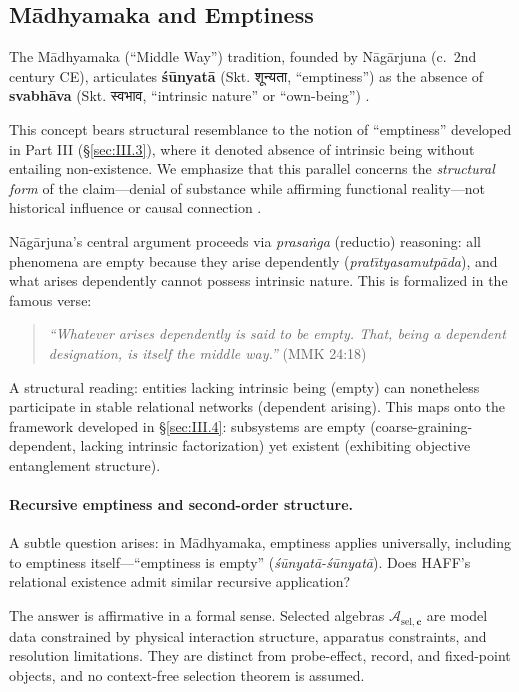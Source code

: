 \documentclass[11pt,a4paper]{article}
\begin{document}
\subsection{M\=adhyamaka and Emptiness}
\label{sec:IV.3}

The M\=adhyamaka (``Middle Way'') tradition, founded by N\=ag\=arjuna (c.\ 2nd century CE), articulates \textbf{śūnyat\=a} (Skt. शून्यता, ``emptiness'') as the absence of \textbf{svabh\=ava} (Skt. स्वभाव, ``intrinsic nature'' or ``own-being'') \cite{Nagarjuna_MMK_Garfield1995}. 

This concept bears structural resemblance to the notion of ``emptiness'' developed in Part III (§\ref{sec:III.3}), where it denoted absence of intrinsic being without entailing non-existence. We emphasize that this parallel concerns the \emph{structural form} of the claim—denial of substance while affirming functional reality—not historical influence or causal connection \cite{Garfield2002,Siderits2007}.

N\=ag\=arjuna's central argument proceeds via \emph{prasaṅga} (reductio) reasoning: all phenomena are empty because they arise dependently (\emph{prat\={\i}tyasamutp\=ada}), and what arises dependently cannot possess intrinsic nature. This is formalized in the famous verse:
\begin{quote}
\emph{``Whatever arises dependently is said to be empty. That, being a dependent designation, is itself the middle way.''} (MMK 24:18) \cite{Nagarjuna_MMK_Garfield1995}
\end{quote}

A structural reading: entities lacking intrinsic being (empty) can nonetheless participate in stable relational networks (dependent arising). This maps onto the framework developed in §\ref{sec:III.4}: subsystems are empty (coarse-graining-dependent, lacking intrinsic factorization) yet existent (exhibiting objective entanglement structure).

\paragraph{Recursive emptiness and second-order structure.}
A subtle question arises: in M\=adhyamaka, emptiness applies universally, including to emptiness itself—``emptiness is empty'' (\emph{śūnyat\=a-śūnyat\=a}). Does HAFF's relational existence admit similar recursive application?

The answer is affirmative in a formal sense. Selected algebras $\mathcal{A}_{\mathrm{sel},\mathbf c}$ are model data constrained by physical interaction structure, apparatus constraints, and resolution limitations.  They are distinct from probe-effect, record, and fixed-point objects, and no context-free selection theorem is assumed.
\end{document}
